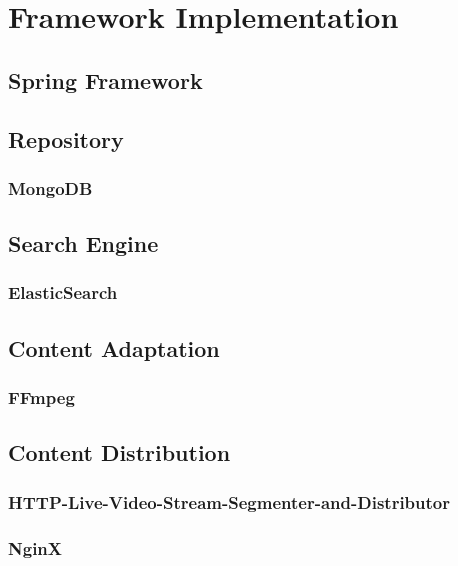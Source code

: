 \section{Framework Implementation\label{sec:impl_used_op_sr}}

	\subsection{Spring Framework\label{sec:impl_sp_fr}}
	
	\subsection{Repository\label{sec:des_repo}}
	\subsubsection{MongoDB\label{sec:impl_mon}}
	
	\subsection{Search Engine\label{sec:des_se_en}}
	\subsubsection{ElasticSearch\label{sec:impl_el_se}}
	
	\subsection{Content Adaptation\label{sec:des_ar_ov}}	
	\subsubsection{FFmpeg\label{sec:impl_ff}}
	
	\subsection{Content Distribution\label{sec:des_cdn}}
	\subsubsection{HTTP-Live-Video-Stream-Segmenter-and-Distributor\label{sec:impl_http_li}}
	\subsubsection{NginX\label{sec:impl_ngi}}
	
